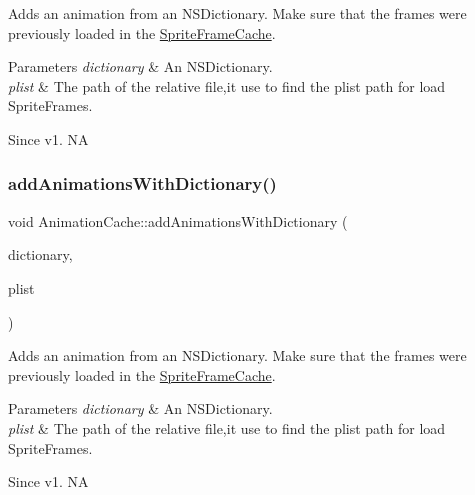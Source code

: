 Adds an animation from an N\+S\+Dictionary. Make sure that the frames were previously loaded in the \hyperlink{classSpriteFrameCache}{Sprite\+Frame\+Cache}. 
\begin{DoxyParams}{Parameters}
{\em dictionary} & An N\+S\+Dictionary. \\
\hline
{\em plist} & The path of the relative file,it use to find the plist path for load Sprite\+Frames. \\
\hline
\end{DoxyParams}
\begin{DoxySince}{Since}
v1.  NA 
\end{DoxySince}
\mbox{\label{classAnimationCache_a7a67abb700f3f21efcb2f69ed44b886a}} 
\subsubsection{\texorpdfstring{add\+Animations\+With\+Dictionary()}{addAnimationsWithDictionary()}\hspace{0.1cm}{\footnotesize\ttfamily [2/2]}}
{\footnotesize\ttfamily void Animation\+Cache\+::add\+Animations\+With\+Dictionary (\begin{DoxyParamCaption}\item[{const Value\+Map \&}]{dictionary,  }\item[{const std\+::string \&}]{plist }\end{DoxyParamCaption})}

Adds an animation from an N\+S\+Dictionary. Make sure that the frames were previously loaded in the \hyperlink{classSpriteFrameCache}{Sprite\+Frame\+Cache}. 
\begin{DoxyParams}{Parameters}
{\em dictionary} & An N\+S\+Dictionary. \\
\hline
{\em plist} & The path of the relative file,it use to find the plist path for load Sprite\+Frames. \\
\hline
\end{DoxyParams}
\begin{DoxySince}{Since}
v1.  NA 
\end{DoxySince}
\mbox{\label{classAnimationCache_a1b7464d9c2cd28731d099cb61aa46697}} 

